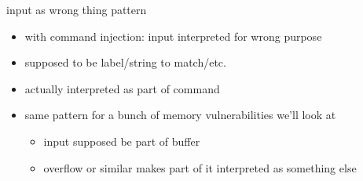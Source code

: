 \begin{frame}{input as wrong thing pattern}
\begin{itemize}
\item with command injection: input interpreted for wrong purpose
\item supposed to be label/string to match/etc.
\item actually interpreted as part of command
\vspace{.5cm}
\item<2-> same pattern for a bunch of memory vulnerabilities we'll look at
    \begin{itemize}
    \item input supposed be part of buffer
    \item overflow or similar makes part of it interpreted as something else
    \end{itemize}
\end{itemize}
\end{frame}

